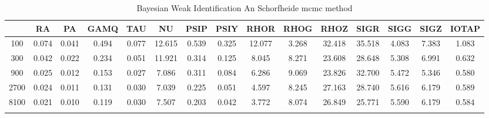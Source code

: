 \documentclass[a4paper,10pt]{article}
\begin{document}
\centering
\begin{longtable}{ccccccccccccccc}
\toprule
 & RA & PA & GAMQ & TAU & NU & PSIP & PSIY & RHOR & RHOG & RHOZ & SIGR & SIGG & SIGZ & IOTAP \\
\midrule
100 & 0.074 & 0.041 & 0.494 & 0.077 & 12.615 & 0.539 & 0.325 & 12.077 & 3.268 & 32.418 & 35.518 & 4.083 & 7.383 & 1.083 \\
300 & 0.042 & 0.022 & 0.234 & 0.051 & 11.921 & 0.314 & 0.125 & 8.045 & 8.271 & 23.608 & 28.648 & 5.308 & 6.991 & 0.632 \\
900 & 0.025 & 0.012 & 0.153 & 0.027 & 7.086 & 0.311 & 0.084 & 6.286 & 9.069 & 23.826 & 32.700 & 5.472 & 5.346 & 0.580 \\
2700 & 0.024 & 0.011 & 0.131 & 0.030 & 7.039 & 0.225 & 0.051 & 4.597 & 8.245 & 27.163 & 28.740 & 5.616 & 6.179 & 0.589 \\
8100 & 0.021 & 0.010 & 0.119 & 0.030 & 7.507 & 0.203 & 0.042 & 3.772 & 8.074 & 26.849 & 25.771 & 5.590 & 6.179 & 0.584 \\
\bottomrule
\caption{Bayesian Weak Identification An Schorfheide mcmc method}
\label{table:tbl:WeakAnScho_mcmc}
\end{longtable}
\end{document}
